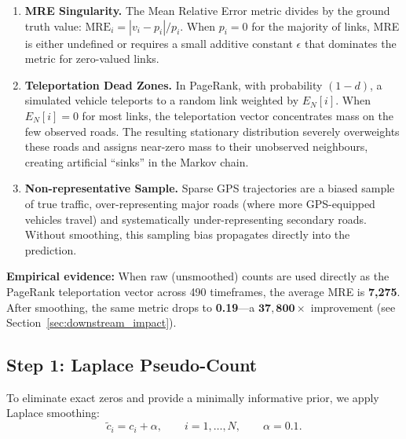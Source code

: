 \documentclass[12pt,a4paper]{article}
\theoremstyle{definition}
\theoremstyle{plain}
\begin{document}
\begin{enumerate}[label=\textbf{C\arabic*.}]
  \item \textbf{MRE Singularity.} The Mean Relative Error metric divides by the ground
    truth value: $\text{MRE}_i = |v_i - p_i| / p_i$. When $p_i = 0$ for the
    majority of links, MRE is either undefined or requires a small additive
    constant $\epsilon$ that dominates the metric for zero-valued links.

  \item \textbf{Teleportation Dead Zones.} In PageRank, with probability $(1-d)$, a
    simulated vehicle teleports to a random link weighted by $E_N[i]$. When $E_N[i]=0$
    for most links, the teleportation vector concentrates mass on the few observed
    roads. The resulting stationary distribution severely overweights these roads and
    assigns near-zero mass to their unobserved neighbours, creating artificial
    ``sinks'' in the Markov chain.

  \item \textbf{Non-representative Sample.} Sparse GPS trajectories are a biased sample
    of true traffic, over-representing major roads (where more GPS-equipped vehicles
    travel) and systematically under-representing secondary roads. Without smoothing,
    this sampling bias propagates directly into the prediction.
\end{enumerate}

\begin{warning}
  \textbf{Empirical evidence:} When raw (unsmoothed) counts are used directly as the
  PageRank teleportation vector across 490 timeframes, the average MRE is
  \textbf{7{,}275}. After smoothing, the same metric drops to \textbf{0.19}---a
  $\boldsymbol{37{,}800\times}$ improvement (see Section~\ref{sec:downstream_impact}).
\end{warning}

\subsection{Step 1: Laplace Pseudo-Count}
\label{sec:laplace}

To eliminate exact zeros and provide a minimally informative prior, we apply Laplace
smoothing:
\begin{equation}
  \tilde{c}_i = c_i + \alpha, \qquad i = 1, \ldots, N, \qquad \alpha = 0.1.
  \label{eq:laplace}
\end{equation}
\end{document}
